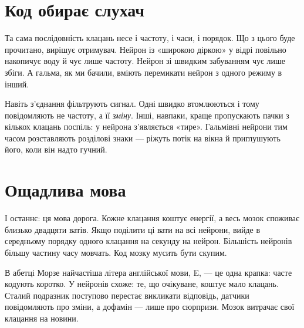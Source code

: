 
\section*{Код обирає слухач}

Та сама послідовність клацань несе і частоту, і часи, і порядок. Що з цього буде прочитано, вирішує отримувач. Нейрон із «широкою діркою» у відрі повільно накопичує воду й чує лише частоту. Нейрон зі швидким забуванням чує лише збіги. А гальма, як ми бачили, вміють перемикати нейрон з одного режиму в інший.

Навіть з'єднання фільтрують сигнал. Одні швидко втомлюються і тому повідомляють не частоту, а її \emph{зміну}. Інші, навпаки, краще пропускають пачки з кількох клацань поспіль: у нейрона з'являється «тире». Гальмівні нейрони тим часом розставляють розділові знаки --- ріжуть потік на вікна й приглушують його, коли він надто гучний.

\section*{Ощадлива мова}

І останнє: ця мова дорога. Кожне клацання коштує енергії, а весь мозок споживає близько двадцяти ватів. Якщо поділити ці вати на всі нейрони, вийде в середньому порядку одного клацання на секунду на нейрон. Більшість нейронів більшу частину часу мовчать. Код мозку мусить бути скупим.

В абетці Морзе найчастіша літера англійської мови, E, --- це одна крапка: часте кодують коротко. У нейронів схоже: те, що очікуване, коштує мало клацань. Сталий подразник поступово перестає викликати відповідь, датчики повідомляють про зміни, а дофамін --- лише про сюрпризи. Мозок витрачає свої клацання на новини.

